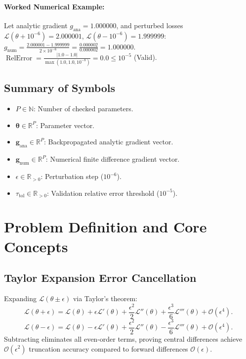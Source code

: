 \documentclass[11pt]{article}
\begin{document}
\paragraph{Worked Numerical Example:}
Let analytic gradient $g_{\mathrm{ana}} = 1.000000$, and perturbed losses $\mathcal{L}(\theta + 10^{-6}) = 2.000001$, $\mathcal{L}(\theta - 10^{-6}) = 1.999999$:
$g_{\mathrm{num}} = \frac{2.000001 - 1.999999}{2 \times 10^{-6}} = \frac{0.000002}{0.000002} = 1.000000$.
$\operatorname{RelError} = \frac{|1.0 - 1.0|}{\max(1.0, 1.0, 10^{-8})} = 0.0 \le 10^{-5}$ (Valid).

\subsection{Summary of Symbols}
\begin{itemize}
    \item $P \in \mathbb{N}$: Number of checked parameters.
    \item $\boldsymbol{\theta} \in \mathbb{R}^P$: Parameter vector.
    \item $\mathbf{g}_{\mathrm{ana}} \in \mathbb{R}^P$: Backpropagated analytic gradient vector.
    \item $\mathbf{g}_{\mathrm{num}} \in \mathbb{R}^P$: Numerical finite difference gradient vector.
    \item $\epsilon \in \mathbb{R}_{>0}$: Perturbation step ($10^{-6}$).
    \item $\tau_{\mathrm{tol}} \in \mathbb{R}_{>0}$: Validation relative error threshold ($10^{-5}$).
\end{itemize}

\section{Problem Definition and Core Concepts}
\label{sec:problem_definition}

\subsection{Taylor Expansion Error Cancellation}
Expanding $\mathcal{L}(\theta \pm \epsilon)$ via Taylor's theorem:
\begin{equation}
\mathcal{L}(\theta + \epsilon) = \mathcal{L}(\theta) + \epsilon \mathcal{L}'(\theta) + \frac{\epsilon^2}{2} \mathcal{L}''(\theta) + \frac{\epsilon^3}{6} \mathcal{L}'''(\theta) + \mathcal{O}(\epsilon^4).
\end{equation}
\begin{equation}
\mathcal{L}(\theta - \epsilon) = \mathcal{L}(\theta) - \epsilon \mathcal{L}'(\theta) + \frac{\epsilon^2}{2} \mathcal{L}''(\theta) - \frac{\epsilon^3}{6} \mathcal{L}'''(\theta) + \mathcal{O}(\epsilon^4).
\end{equation}
Subtracting eliminates all even-order terms, proving central differences achieve $\mathcal{O}(\epsilon^2)$ truncation accuracy compared to forward differences $\mathcal{O}(\epsilon)$.
\end{document}
